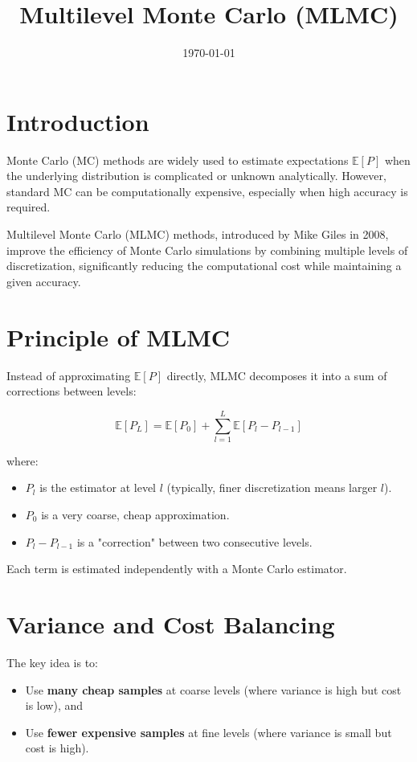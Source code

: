 \documentclass{article}
\title{Multilevel Monte Carlo (MLMC)}
\date{\today}
\begin{document}
\maketitle

\section{Introduction}
Monte Carlo (MC) methods are widely used to estimate expectations $\mathbb{E}[P]$ when the underlying distribution is complicated or unknown analytically.
However, standard MC can be computationally expensive, especially when high accuracy is required.\newline

Multilevel Monte Carlo (MLMC) methods, introduced by Mike Giles in 2008, improve the efficiency of Monte Carlo simulations by combining multiple levels of discretization, significantly reducing the computational cost while maintaining a given accuracy.

\section{Principle of MLMC}
Instead of approximating $\mathbb{E}[P]$ directly, MLMC decomposes it into a sum of corrections between levels:

\begin{equation}
\mathbb{E}[P_L] = \mathbb{E}[P_0] + \sum_{l=1}^L \mathbb{E}[P_l - P_{l-1}]
\end{equation}

where:
\begin{itemize}
  \item $P_l$ is the estimator at level $l$ (typically, finer discretization means larger $l$).
  \item $P_0$ is a very coarse, cheap approximation.
  \item $P_l - P_{l-1}$ is a "correction" between two consecutive levels.
\end{itemize}

Each term is estimated independently with a Monte Carlo estimator.

\section{Variance and Cost Balancing}
The key idea is to:
\begin{itemize}
  \item Use \textbf{many cheap samples} at coarse levels (where variance is high but cost is low), and
  \item Use \textbf{fewer expensive samples} at fine levels (where variance is small but cost is high).
\end{itemize}
\end{document}
